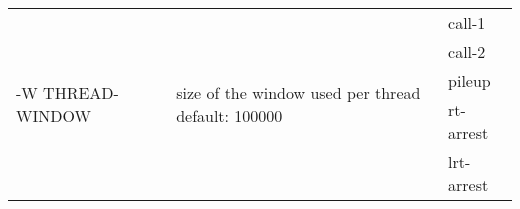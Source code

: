 {\small
\begin{tabular}{@{}p{}p{}l@{}}
\multirow{5}{=}{-W THREAD-WINDOW} & \multirow{5}{=}{size of the window used per thread
default: 100000} & call-1 \\
 &  & call-2 \\
 &  & pileup \\
 &  & rt-arrest \\
 &  & lrt-arrest \\
\end{tabular}\\
}
